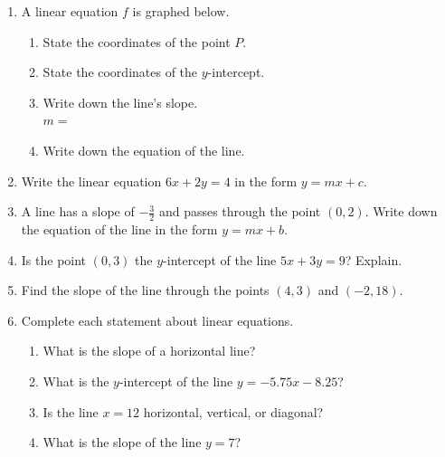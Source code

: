 \begin{enumerate}
\item A linear equation $f$ is graphed below.
\begin{multicols}{2}
\begin{enumerate}
  \item State the coordinates of the point $P$.
  \item State the coordinates of the $y$-intercept.
  \item Write down the line's slope.\\ $m=$
  \vspace{0.25cm}
  \item Write down the equation of the line.
  \vspace{1cm}
\end{enumerate} \vspace{.5cm}
  \begin{center} 
  \end{center}
\end{multicols}

\item Write the linear equation $6x+2y=4$ in the form $y=mx+c$. \vspace{4cm}

\item A line has a slope of $\displaystyle -\frac{3}{2}$ and passes through the point $(0, 2)$. Write down the equation of the line in the form $y=mx+b$. \vspace{3cm}

\item Is the point $(0,3)$ the $y$-intercept of the line $5x+3y=9$? Explain.

\newpage
\item Find the slope of the line through the points $(4, 3)$ and $(-2, 18)$. \vspace{4cm}

\item Complete each statement about linear equations.
\begin{enumerate}[itemsep=0.5cm]
  \item What is the slope of a horizontal line?
  \item What is the $y$-intercept of the line $y = -5.75x - 8.25$?
  \item Is the line $x=12$ horizontal, vertical, or diagonal?
  \item What is the slope of the line $y=7$?
  \end{enumerate} \vspace{0.5cm}


\end{enumerate}
